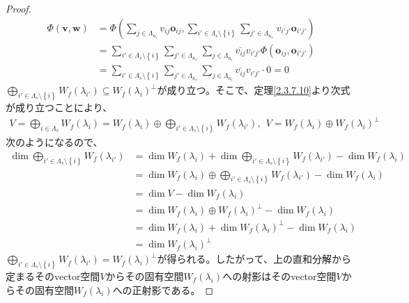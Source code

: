 \documentclass[dvipdfmx]{jsarticle}
\begin{document}
\begin{proof}
\begin{align*}
\varPhi\left( \mathbf{v},\mathbf{w} \right) &= \varPhi\left( \sum_{j \in \varLambda_{n_{i}}} {v_{ij}\mathbf{o}_{ij}},\sum_{i' \in \varLambda_s \setminus \left\{ i \right\}} {\sum_{j' \in \varLambda_{n_{i'}}} {v_{i'j'}\mathbf{o}_{i'j'}}} \right)\\
&= \sum_{i' \in \varLambda_s \setminus \left\{ i \right\}} {\sum_{j' \in \varLambda_{n_{i'}}} {\sum_{j \in \varLambda_{n_{i}}} {\overline{v_{ij}}v_{i'j'}\varPhi\left( \mathbf{o}_{ij},\mathbf{o}_{i'j'} \right)}}}\\
&= \sum_{i' \in \varLambda_s \setminus \left\{ i \right\}} {\sum_{j' \in \varLambda_{n_{i'}}} {\sum_{j \in \varLambda_{n_{i}}} {\overline{v_{ij}}v_{i'j'} \cdot 0}}} = 0
\end{align*}
$\bigoplus_{i' \in \varLambda_s \setminus \left\{ i \right\}} {W_{f}\left( \lambda_{i'} \right)} \subseteq {W_{f}\left( \lambda_{i} \right)}^{\bot}$が成り立つ。そこで、定理\ref{2.3.7.10}より次式が成り立つことにより、
\begin{align*}
V = \bigoplus_{i \in \varLambda_{s}} {W_{f}\left( \lambda_{i} \right)} = W_{f}\left( \lambda_{i} \right) \oplus \bigoplus_{i' \in \varLambda_s \setminus \left\{ i \right\}} {W_{f}\left( \lambda_{i'} \right)},\ \ V = W_{f}\left( \lambda_{i} \right) \oplus {W_{f}\left( \lambda_{i} \right)}^{\bot}
\end{align*}
次のようになるので、
\begin{align*}
\dim{\bigoplus_{i' \in \varLambda_s \setminus \left\{ i \right\}} {W_{f}\left( \lambda_{i'} \right)}} &= \dim{W_{f}\left( \lambda_{i} \right)} + \dim{\bigoplus_{i' \in \varLambda_s \setminus \left\{ i \right\}} {W_{f}\left( \lambda_{i'} \right)}} - \dim{W_{f}\left( \lambda_{i} \right)}\\
&= \dim{W_{f}\left( \lambda_{i} \right) \oplus \bigoplus_{i' \in \varLambda_s \setminus \left\{ i \right\}} {W_{f}\left( \lambda_{i'} \right)}} - \dim{W_{f}\left( \lambda_{i} \right)}\\
&= \dim V - \dim{W_{f}\left( \lambda_{i} \right)}\\
&= \dim{W_{f}\left( \lambda_{i} \right) \oplus {W_{f}\left( \lambda_{i} \right)}^{\bot}} - \dim{W_{f}\left( \lambda_{i} \right)}\\
&= \dim{W_{f}\left( \lambda_{i} \right)} + \dim{W_{f}\left( \lambda_{i} \right)}^{\bot} - \dim{W_{f}\left( \lambda_{i} \right)}\\
&= \dim{W_{f}\left( \lambda_{i} \right)}^{\bot}
\end{align*}
$\bigoplus_{i' \in \varLambda_s \setminus \left\{ i \right\}} {W_{f}\left( \lambda_{i'} \right)} = {W_{f}\left( \lambda_{i} \right)}^{\bot}$が得られる。したがって、上の直和分解から定まるそのvector空間$V$からその固有空間$W_{f}\left( \lambda_{i} \right)$への射影はそのvector空間$V$からその固有空間$W_{f}\left( \lambda_{i} \right)$への正射影である。
\end{proof}
\end{document}
